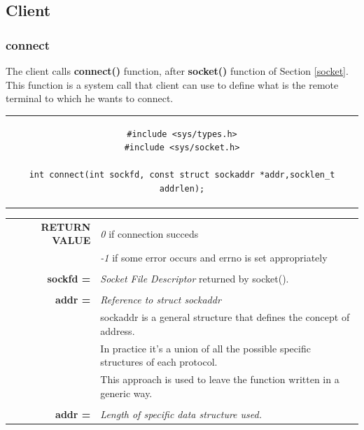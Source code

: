\subsection{Client}
\subsubsection{connect}
The client calls \textbf{connect()} function, after \textbf{socket()} function of Section \ref{socket}. This function is a system call that client can use to define what is the remote terminal to which he wants to connect.

\begin{center}
\begin{tabular}{c}
\begin{lstlisting}[linewidth=370pt, basicstyle=\footnotesize\sffamily,]
#include <sys/types.h>
#include <sys/socket.h>

int connect(int sockfd, const struct sockaddr *addr,socklen_t addrlen);
\end{lstlisting}
\end{tabular}
\end{center}

\begin{table}[h]
\centering
\begin{tabular}{rcl}
\textbf{RETURN VALUE} & \multicolumn{2}{l}{\textit{0} if connection succeds}\\
{} & \multicolumn{2}{l}{\textit{-1} if some error occurs and errno is set appropriately}\\
& & \\
\textbf{sockfd =} & \multicolumn{2}{l}{\textit{Socket File Descriptor} returned by socket().}\\
& &\\
\textbf{addr =} & \multicolumn{2}{l}{\textit{Reference to struct sockaddr}}\\
{} & \multicolumn{2}{l}{sockaddr is a general structure that defines the concept of address.}\\
{} & \multicolumn{2}{l}{In practice it's a union of all the possible specific structures of each protocol.}\\
{} & \multicolumn{2}{l}{This approach is used to leave the function written in a generic way.}\\
& & \\
\textbf{addr =} & \multicolumn{2}{l}{\textit{Length of specific data structure used.}}\\
\end{tabular}
\end{table}

